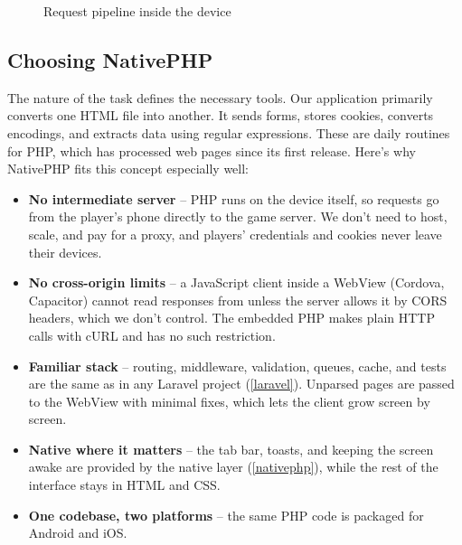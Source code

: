 \begin{figure}[h]
  \centering
  \caption{Request pipeline inside the device}
  \label{img:concept-pipeline}
\end{figure}


\subsection{Choosing NativePHP}

The nature of the task defines the necessary tools. Our application primarily converts one HTML
file into another. It sends forms, stores cookies, converts encodings, and extracts data using
regular expressions. These are daily routines for PHP, which has processed web pages since its
first release. Here's why NativePHP fits this concept especially well:

\begin{itemize}
  \item \textbf{No intermediate server} -- PHP runs on the device itself, so requests go from the
  player's phone directly to the game server. We don't need to host, scale, and pay for a proxy,
  and players' credentials and cookies never leave their devices.

  \item \textbf{No cross-origin limits} -- a JavaScript client inside a WebView (Cordova,
  Capacitor) cannot read responses from  unless the server allows it by CORS
  headers, which we don't control. The embedded PHP makes plain HTTP calls with cURL and has no
  such restriction.

  \item \textbf{Familiar stack} -- routing, middleware, validation, queues, cache, and tests are
  the same as in any Laravel project (\cref{laravel}). Unparsed pages are passed to the WebView
  with minimal fixes, which lets the client grow screen by screen.

  \item \textbf{Native where it matters} -- the tab bar, toasts, and keeping the screen awake
  are provided by the native layer (\cref{nativephp}), while the rest of the interface stays in
  HTML and CSS.

  \item \textbf{One codebase, two platforms} -- the same PHP code is packaged for Android and
  iOS.
\end{itemize}

